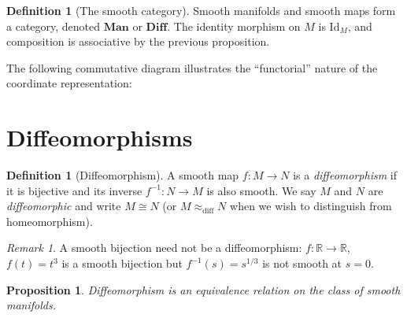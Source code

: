 \documentclass[12pt,a4paper,openany]{book}
\newtheorem{proposition}[theorem]{Proposition}
\theoremstyle{definition}
\newtheorem{definition}[theorem]{Definition}
\theoremstyle{remark}
\newtheorem{remark}[theorem]{Remark}
\newcommand{\R}{\mathbb{R}}
\newcommand{\Id}{\mathrm{Id}}
\begin{document}
\begin{definition}[The smooth category]\label{def:smooth-category}
Smooth manifolds and smooth maps form a category, denoted $\mathbf{Man}$ or
$\mathbf{Diff}$.  The identity morphism on $M$ is $\Id_M$, and composition
is associative by the previous proposition.
\end{definition}

The following commutative diagram illustrates the ``functorial'' nature of
the coordinate representation:

\begin{center}
\label{fig:composition-diagram}
\end{center}

\section{Diffeomorphisms}
\label{sec:diffeomorphisms}

\begin{definition}[Diffeomorphism]\label{def:diffeomorphism}
A smooth map $f \colon M \to N$ is a \emph{diffeomorphism} if it is
bijective and its inverse $f^{-1} \colon N \to M$ is also smooth.  We say
$M$ and $N$ are \emph{diffeomorphic} and write
$M \cong N$ (or $M \approx_{\mathrm{diff}} N$ when we wish to distinguish
from homeomorphism).
\end{definition}

\begin{remark}\label{rem:diffeo-vs-homeo}
A smooth bijection need not be a diffeomorphism: $f \colon \R \to \R$,
$f(t) = t^3$ is a smooth bijection but $f^{-1}(s) = s^{1/3}$ is not smooth
at $s = 0$.
\end{remark}

\begin{proposition}\label{prop:diffeo-equivalence}
Diffeomorphism is an equivalence relation on the class of smooth manifolds.
\end{proposition}
\end{document}
